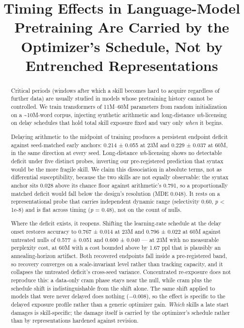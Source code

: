 \documentclass[11pt]{article}
\title{Timing Effects in Language-Model Pretraining Are Carried by the
Optimizer's Schedule, Not by Entrenched Representations}
\author{}
\begin{document}
\maketitle
\begin{abstract}
Critical periods (windows after which a skill becomes hard to acquire regardless of further
data) are usually studied in models whose pretraining history cannot be controlled. We train
transformers of 11M--60M parameters from random initialization on a \textasciitilde10M-word corpus,
injecting synthetic arithmetic and long-distance \emph{wh}-licensing on delay schedules that hold
total skill exposure fixed and vary only \emph{when} it begins.

Delaying arithmetic to the midpoint of training produces a persistent endpoint deficit
against seed-matched early anchors: 0.214 ± 0.055 at 23M and 0.229 ± 0.037 at 60M, in the
same direction at every seed. Long-distance \emph{wh}-licensing shows no detectable deficit under
five distinct probes, inverting our pre-registered prediction that syntax would be the more
fragile skill. We claim this dissociation in absolute terms, not as differential
susceptibility, because the two skills are not equally observable: the syntax anchor sits
0.028 above its chance floor against arithmetic's 0.791, so a proportionally matched deficit
would fall below the design's resolution (MDE 0.048). It rests on a representational probe
that carries independent dynamic range (selectivity 0.60, \emph{p} \textless{} 1e-8) and is flat across
timing (\emph{p} = 0.48), not on the count of nulls.

Where the deficit exists, it reopens. Shifting the learning-rate schedule at the delay onset
restores accuracy to 0.767 ± 0.014 at 23M and 0.796 ± 0.022 at 60M against untreated nulls
of 0.577 ± 0.051 and 0.600 ± 0.040 — at 23M with no measurable perplexity cost, at 60M with
a cost bounded above by 1.67 ppl that is plausibly an annealing-horizon artifact. Both
recovered endpoints fall inside a pre-registered band, so recovery converges on a
scale-invariant level rather than tracking capacity, and it collapses the untreated
deficit's cross-seed variance. Concentrated re-exposure does not reproduce this: a data-only
cram phase stays near the null, while cram plus the schedule shift is indistinguishable from
the shift alone. The same shift applied to models that were never delayed does nothing
(−0.008), so the effect is specific to the delayed exposure profile rather than a generic
optimizer gain. \emph{Which} skills a late start damages is skill-specific; the damage itself is
carried by the optimizer's schedule rather than by representations hardened against revision.

\end{abstract}
\end{document}
